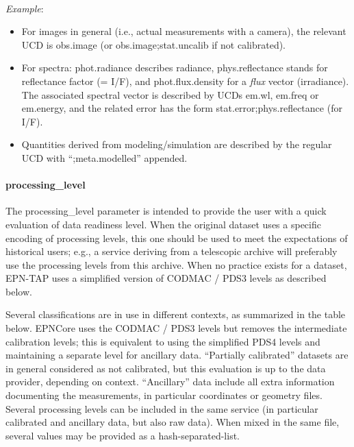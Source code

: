 \documentclass[11pt,a4paper]{ivoa}
\begin{document}
\textbf{\\}
\emph{Example}:

\begin{itemize}
\item For images in general (i.e., actual measurements with a camera),
the relevant UCD is obs.image (or obs.image;stat.uncalib if not
calibrated).

\item For spectra: phot.radiance describes radiance, phys.reflectance
stands for reflectance factor (= I/F), and phot.flux.density for a
\emph{flux} vector (irradiance). The associated spectral vector is
described by UCDs em.wl, em.freq or em.energy, and the related error
has the form stat.error;phys.reflectance (for I/F).

\item Quantities derived from modeling/simulation are described by the
regular UCD with ``;meta.modelled'' appended.
\end{itemize}

\paragraph{processing\_level}

The processing\_level parameter is intended to provide the user with
a quick evaluation of data readiness level. When the original dataset
uses a specific encoding of processing levels, this one should be used
to meet the expectations of historical users; e.g., a service deriving
from a telescopic archive will preferably use the processing levels
from this archive. When no practice exists for a dataset, EPN-TAP uses
a simplified version of CODMAC / PDS3 levels as described below.

Several classifications are in use in different contexts, as summarized
in the table below.  EPNCore uses the CODMAC / PDS3 levels but removes
the intermediate calibration levels; this is equivalent to using the
simplified PDS4 levels and maintaining a separate level for ancillary
data. ``Partially calibrated'' datasets are in general considered as not
calibrated, but this evaluation is up to the data provider, depending on
context. ``Ancillary'' data include all extra information documenting
the measurements, in particular coordinates or geometry files. Several
processing levels can be included in the same service (in particular
calibrated and ancillary data, but also raw data). When mixed in the
same file, several values may be provided as a hash-separated-list.
\end{document}

